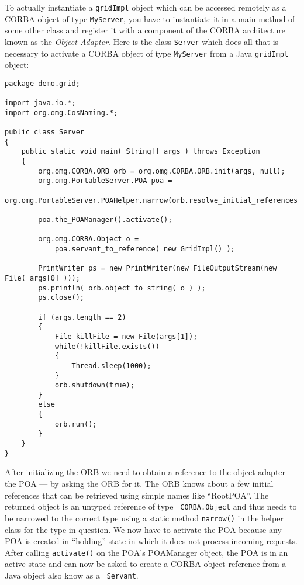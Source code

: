 To actually instantiate a {\tt  gridImpl} object which can be accessed
remotely  as  a CORBA  object  of type  {\tt  MyServer},  you have  to
instantiate it  in a main method  of some other class  and register it
with a  component of the CORBA  architecture known as  the {\it Object
Adapter}. Here is  the class {\tt Server} which  does all that is
necessary to  activate a  CORBA object of  type {\tt MyServer}  from a
Java {\tt gridImpl} object:

\small{
\begin{verbatim}
package demo.grid;

import java.io.*;
import org.omg.CosNaming.*;

public class Server
{
    public static void main( String[] args ) throws Exception
    {
        org.omg.CORBA.ORB orb = org.omg.CORBA.ORB.init(args, null);
        org.omg.PortableServer.POA poa =
            org.omg.PortableServer.POAHelper.narrow(orb.resolve_initial_references("RootPOA"));

        poa.the_POAManager().activate();

        org.omg.CORBA.Object o =
            poa.servant_to_reference( new GridImpl() );

        PrintWriter ps = new PrintWriter(new FileOutputStream(new File( args[0] )));
        ps.println( orb.object_to_string( o ) );
        ps.close();

        if (args.length == 2)
        {
            File killFile = new File(args[1]);
            while(!killFile.exists())
            {
                Thread.sleep(1000);
            }
            orb.shutdown(true);
        }
        else
        {
            orb.run();
        }
    }
}
\end{verbatim}
}

After initializing the ORB we need to obtain a reference to the object
adapter --- the POA --- by asking  the ORB for it. The ORB knows about
a few initial references that can be retrieved using simple names like
``RootPOA''. The returned object is  an untyped reference of type {\tt
CORBA.Object} and thus needs to  be narrowed to the correct type using
a static  method {\tt narrow()}  in the helper  class for the  type in
question. We now  have to activate the POA because  any POA is created
in  ``holding''   state  in  which   it  does  not   process  incoming
requests.  After  calling {\tt  activate()}  on  the POA's  POAManager
object, the POA is in an active state and can now be asked to create a
CORBA  object  reference  from a  Java  object  also  know as  a  {\tt
Servant}.


